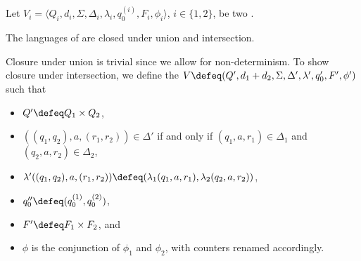 

Let $V_i=\langle Q_i,d_i, \Sigma,\Delta_i,\lambda_i,q_0^{(i)},F_i,\phi_i \rangle$,
$i\in
\{1,2\}$, be two \laVASS.

\begin{proposition}
  The languages of \laVASS are closed under union and intersection.
\end{proposition}

Closure under union is trivial since we allow for non-determinism. To
show closure under intersection, we define the \laVASS $V \defeq
(Q',d_1+d_2,\Sigma,\Delta',\lambda',q_0',F',\phi')$ such that
%
\begin{itemize}
\item $Q' \defeq Q_1\times Q_2$,
\item $((q_1,q_2),a,(r_1,r_2)) \in \Delta'$ if and only if $(q_1,a,r_1)\in \Delta_1$ and $(q_2,a,r_2)\in \Delta_2$,
\item $\lambda'((q_1,q_2),a,(r_1,r_2)) \defeq (\lambda_1(q_1,a,r_1), \lambda_2(q_2,a,r_2))$,
\item $q_0'' \defeq (q_0^{(1)},q_0^{(2)})$,
\item $F' \defeq F_1\times F_2$, and
\item $\phi$ is the conjunction of $\phi_1$ and $\phi_2$, with counters
renamed accordingly.
\end{itemize}

